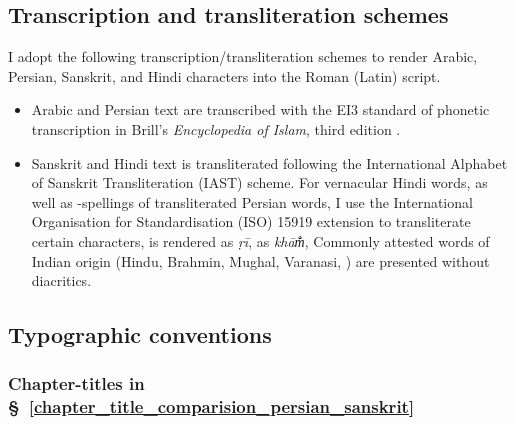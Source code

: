 \subsection{Transcription and transliteration schemes}\label{transcription_transliteration_schemes}
I adopt the following transcription/transliteration schemes to render Arabic, Persian, Sanskrit, and Hindi characters into the Roman (Latin) script.     
\begin{itemize}[topsep=0pt]
    \item Arabic and Persian text are transcribed with the EI3 standard of phonetic transcription in Brill's \textit{Encyclopedia of Islam}, third edition \parencite[]{EIslam}.
    \item Sanskrit and Hindi text is transliterated following the International Alphabet of Sanskrit Transliteration (IAST) scheme. For vernacular Hindi words, as well as \Devanagari-spellings of transliterated Persian words, I use the International Organisation for Standardisation (ISO) 15919 extension to transliterate certain characters,  is rendered as \textit{ṛī},  as \textit{khām̐}, \etc Commonly attested words of Indian origin (\eg Hindu, Brahmin, Mughal, Varanasi, \etcp) are presented without diacritics.
\end{itemize}

\subsection{Typographic conventions} \label{typographic_conventions} 
\subsubsection{Chapter-titles in \S~\ref{chapter_title_comparision_persian_sanskrit}}\label{chapter_titles_in_zij_sindhu}

